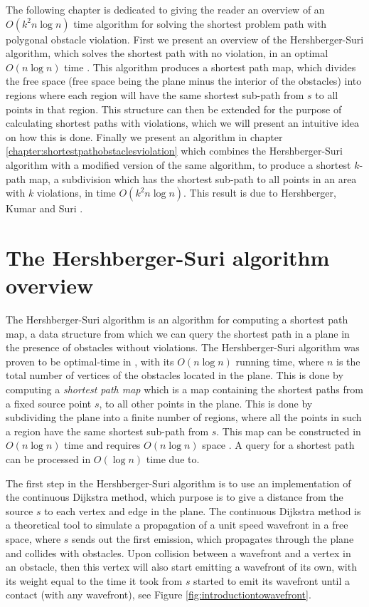 The following chapter is dedicated to giving the reader an overview of an $O(k^2 n \log n)$ 
time algorithm for solving the shortest problem path with polygonal obstacle violation. First we present an 
overview of the Hershberger-Suri algorithm, which solves the shortest path with no violation, 
in an optimal $O(n \log n)$ time \cite{HershbergerS99}. This algorithm produces a shortest 
path map, which divides the free space (free space being the plane minus the interior of the 
obstacles) into regions where each region will have the same shortest sub-path from $s$ to 
all points in that region. This structure can then be extended for the purpose of calculating 
shortest paths with violations, which we will present an intuitive idea on how this is done. 
Finally we present an algorithm in chapter \ref{chapter:shortestpathobstaclesviolation} which
combines the Hershberger-Suri algorithm with a modified version of the same algorithm, 
to produce a shortest $k$-path map, a subdivision 
which has the shortest sub-path to all points in an area with $k$ violations, in time $O(k^2 
n \log n)$. This result is due to Hershberger, Kumar and Suri \cite{HershbergerKS17}.

\section{The Hershberger-Suri algorithm overview}

The Hershberger-Suri algorithm is an algorithm for computing a shortest path map, a
data structure from which we can query the shortest path in a plane in the presence of 
obstacles without violations. The Hershberger-Suri algorithm was proven to be optimal-time 
in \cite{HershbergerS99}, with its $O(n \log n)$ running time, where $n$ is the total number of vertices 
of the obstacles located in the plane. This is done by computing a \emph{shortest path map} 
which is  a map containing the shortest paths from a fixed source point $s$, to all 
other points in the plane. This is done by subdividing the plane into a finite number
of regions, where all the points in such a region have the same shortest sub-path
from $s$. This map can be constructed in $O(n\log n)$ time and requires $O(n\log n)$ 
space \cite{HershbergerS99}. A query for a shortest path can be processed in $O(\log n)$
time due to\cite{DBLP:journals/siamcomp/Kirkpatrick83}. 

The first step in the Hershberger-Suri algorithm is to use an implementation of
the continuous Dijkstra method, which purpose is to give a distance from the
source $s$ to each vertex and edge in the plane. The continuous Dijkstra method
is a theoretical tool to simulate a propagation of a unit speed wavefront in a
free space, where $s$ sends out the first emission, which propagates through
the plane and collides with obstacles. Upon collision between a wavefront and
a vertex in an obstacle, then this vertex will also start emitting a wavefront
of its own, with its weight equal to the time it took from $s$ started to emit
its wavefront until a contact (with any wavefront), see Figure \ref{fig:introductiontowavefront}. 

